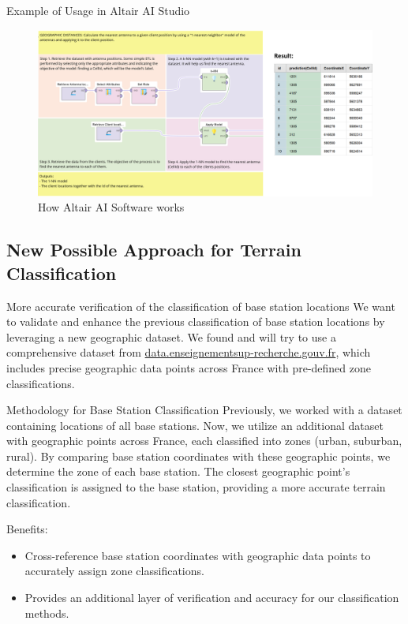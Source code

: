 \begin{frame}{Example of Usage in Altair AI Studio}
    \begin{figure}
        \includegraphics[height=0.6\paperheight]{images/Altair/Altair_proc_exmpl.png}
        \caption{How Altair AI Software works}
    \end{figure}
\end{frame}


\subsection{New Possible Approach for Terrain Classification}
\insertsubsectionframe

\begin{frame}{More accurate verification of the classification of base station locations}
We want to validate and enhance the previous classification of base station locations by leveraging a new geographic dataset. 
We found and will try to use a comprehensive dataset from \url{data.enseignementsup-recherche.gouv.fr}, which includes precise geographic data points across France with pre-defined zone classifications.
\begin{block}{Methodology for Base Station Classification}
    Previously, we worked with a dataset containing locations of all base stations. Now, we utilize an additional dataset with geographic points across France, each classified into zones (urban, suburban, rural). By comparing base station coordinates with these geographic points, we determine the zone of each base station. The closest geographic point's classification is assigned to the base station, providing a more accurate terrain classification.
\end{block}
    \begin{block}{Benefits:}
        \begin{itemize}
            \item Cross-reference base station coordinates with geographic data points to accurately assign zone classifications.
            \item Provides an additional layer of verification and accuracy for our classification methods.
        \end{itemize}
    \end{block}
\end{frame}




